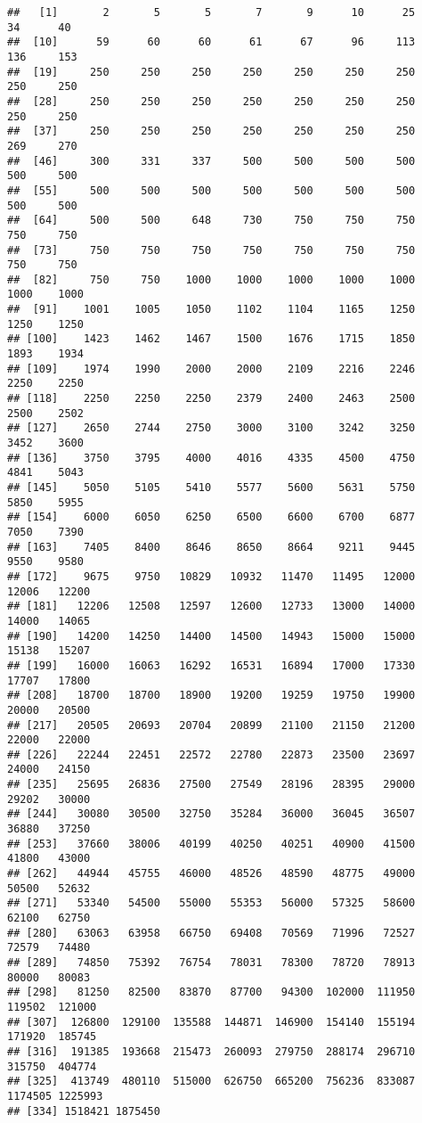 \documentclass[
]{book}
\begin{document}
\begin{verbatim}
##   [1]       2       5       5       7       9      10      25      34      40
##  [10]      59      60      60      61      67      96     113     136     153
##  [19]     250     250     250     250     250     250     250     250     250
##  [28]     250     250     250     250     250     250     250     250     250
##  [37]     250     250     250     250     250     250     250     269     270
##  [46]     300     331     337     500     500     500     500     500     500
##  [55]     500     500     500     500     500     500     500     500     500
##  [64]     500     500     648     730     750     750     750     750     750
##  [73]     750     750     750     750     750     750     750     750     750
##  [82]     750     750    1000    1000    1000    1000    1000    1000    1000
##  [91]    1001    1005    1050    1102    1104    1165    1250    1250    1250
## [100]    1423    1462    1467    1500    1676    1715    1850    1893    1934
## [109]    1974    1990    2000    2000    2109    2216    2246    2250    2250
## [118]    2250    2250    2250    2379    2400    2463    2500    2500    2502
## [127]    2650    2744    2750    3000    3100    3242    3250    3452    3600
## [136]    3750    3795    4000    4016    4335    4500    4750    4841    5043
## [145]    5050    5105    5410    5577    5600    5631    5750    5850    5955
## [154]    6000    6050    6250    6500    6600    6700    6877    7050    7390
## [163]    7405    8400    8646    8650    8664    9211    9445    9550    9580
## [172]    9675    9750   10829   10932   11470   11495   12000   12006   12200
## [181]   12206   12508   12597   12600   12733   13000   14000   14000   14065
## [190]   14200   14250   14400   14500   14943   15000   15000   15138   15207
## [199]   16000   16063   16292   16531   16894   17000   17330   17707   17800
## [208]   18700   18700   18900   19200   19259   19750   19900   20000   20500
## [217]   20505   20693   20704   20899   21100   21150   21200   22000   22000
## [226]   22244   22451   22572   22780   22873   23500   23697   24000   24150
## [235]   25695   26836   27500   27549   28196   28395   29000   29202   30000
## [244]   30080   30500   32750   35284   36000   36045   36507   36880   37250
## [253]   37660   38006   40199   40250   40251   40900   41500   41800   43000
## [262]   44944   45755   46000   48526   48590   48775   49000   50500   52632
## [271]   53340   54500   55000   55353   56000   57325   58600   62100   62750
## [280]   63063   63958   66750   69408   70569   71996   72527   72579   74480
## [289]   74850   75392   76754   78031   78300   78720   78913   80000   80083
## [298]   81250   82500   83870   87700   94300  102000  111950  119502  121000
## [307]  126800  129100  135588  144871  146900  154140  155194  171920  185745
## [316]  191385  193668  215473  260093  279750  288174  296710  315750  404774
## [325]  413749  480110  515000  626750  665200  756236  833087 1174505 1225993
## [334] 1518421 1875450
\end{verbatim}
\end{document}
